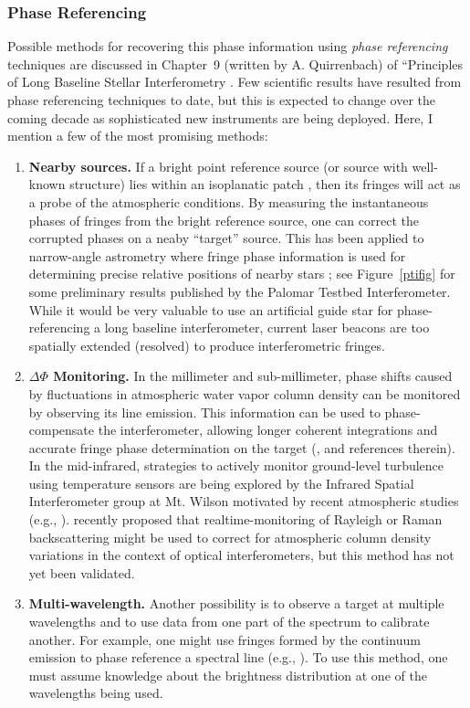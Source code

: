 \documentclass[12pt]{article}
\begin{document}
\subsubsection{Phase Referencing}
Possible methods for recovering this phase information using {\em
  phase referencing} techniques are discussed in Chapter~9 (written by
A. Quirrenbach) of ``Principles of Long Baseline Stellar
Interferometry \citep{mss2000}.  Few scientific results have resulted
from phase referencing techniques to date, but this is expected to
change over the coming decade as sophisticated new instruments are
being deployed.  Here, I mention a few of the most promising methods:

\begin{enumerate} 
\item{ {\bf Nearby sources.}  If a bright point reference source (or
    source with well-known structure) lies within an isoplanatic
    patch \citep[see][]{quirrenbach2000}, then its fringes will act as
    a probe of the atmospheric conditions.  By measuring the
    instantaneous phases of fringes from the bright reference source,
    one can correct the corrupted phases on a neaby ``target'' source.
    This has been applied to narrow-angle astrometry where fringe
    phase information is used for determining precise relative
    positions of nearby stars \citep{shao92,colavita99,lane2000a}; see
    Figure~\ref{ptifig} for some preliminary results published by the
    Palomar Testbed Interferometer.  While it would be very valuable
    to use an artificial guide star for phase-referencing a long
    baseline interferometer, current laser beacons are too spatially
    extended (resolved) to produce interferometric fringes.}
\item{{\bf $\Delta\Phi$ Monitoring.}  In the millimeter and
    sub-millimeter, phase shifts caused by fluctuations in atmospheric
    water vapor column density can be monitored by observing its line
    emission.  This information can be used to phase-compensate the
    interferometer, allowing longer coherent integrations and accurate
    fringe phase determination on the target (\citealt{wiedner98}, and
    references therein).  In the mid-infrared, strategies to actively
    monitor ground-level turbulence using temperature sensors are
    being explored by the Infrared Spatial Interferometer group
    \citep{short2002} at Mt. Wilson motivated by recent atmospheric
    studies (e.g., \citealt{bester92}).  \citet{townes2002} recently
    proposed that realtime-monitoring of Rayleigh or Raman
    backscattering might be used to correct for atmospheric column
    density variations in the context of optical interferometers, but
    this method has not yet been validated.  }
\item{{\bf Multi-wavelength.}  Another possibility is to observe a
    target at multiple wavelengths and to use data from one part of
    the spectrum to calibrate another.  For example, one might use
    fringes formed by the continuum emission to phase reference a
    spectral line (e.g., \citealt{gi2t97}).  To use this method, one
    must assume knowledge about the brightness distribution at one of
    the wavelengths being used.}
\end{enumerate}
\end{document}
